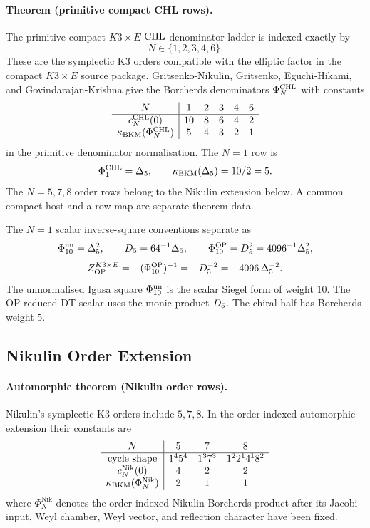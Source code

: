 \paragraph{Theorem (primitive compact CHL rows).}
The primitive compact \(K3\times E\) \(\mathrm{CHL}\) denominator ladder is
indexed exactly by
\[
  N\in\{1,2,3,4,6\}.
\]
These are the symplectic K3 orders compatible with the elliptic factor
in the compact \(K3\times E\) source package.  Gritsenko-Nikulin, Gritsenko,
Eguchi-Hikami, and Govindarajan-Krishna give the Borcherds denominators
\(\Phi_N^{\mathrm{CHL}}\) with constants
\[
\begin{array}{c|ccccc}
N&1&2&3&4&6\\ \hline
c_N^{\mathrm{CHL}}(0)&10&8&6&4&2\\
\kappa_{\mathrm{BKM}}(\Phi_N^{\mathrm{CHL}})&5&4&3&2&1
\end{array}
\]
in the primitive denominator normalisation.  The \(N=1\) row is
\[
  \Phi_1^{\mathrm{CHL}}=\Delta_5,\qquad
  \kappa_{\mathrm{BKM}}(\Delta_5)=10/2=5.
\]
The \(N=5,7,8\) order rows belong to the Nikulin extension below.  A
common compact host and a row map are separate theorem data.

The \(N=1\) scalar inverse-square conventions separate as
\[
  \Phi_{10}^{\mathrm{un}}=\Delta_5^2,\qquad
  D_5=64^{-1}\Delta_5,\qquad
  \Phi_{10}^{\mathrm{OP}}=D_5^2=4096^{-1}\Delta_5^2,
\]
\[
  Z_{\mathrm{OP}}^{K3\times E}=-(\Phi_{10}^{\mathrm{OP}})^{-1}
  =-D_5^{-2}
  =-4096\,\Delta_5^{-2}.
\]
The unnormalised Igusa square \(\Phi_{10}^{\mathrm{un}}\) is the scalar Siegel form of
weight \(10\).  The OP reduced-DT scalar uses the monic product
\(D_5\).  The chiral half has Borcherds weight \(5\).

\subsection*{Nikulin Order Extension}

\paragraph{Automorphic theorem (Nikulin order rows).}
Nikulin's symplectic K3 orders include \(5,7,8\).  In the order-indexed
automorphic extension their constants are
\[
\begin{array}{c|ccc}
N&5&7&8\\ \hline
\text{cycle shape}&1^4 5^4&1^3 7^3&1^2 2^1 4^1 8^2\\
c_N^{\mathrm{Nik}}(0)&4&2&2\\
\kappa_{\mathrm{BKM}}(\Phi_N^{\mathrm{Nik}})&2&1&1
\end{array}
\]
where \(\Phi_N^{\mathrm{Nik}}\) denotes the order-indexed Nikulin
Borcherds product after its Jacobi input, Weyl chamber, Weyl vector,
and reflection character have been fixed.

